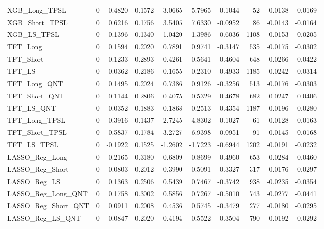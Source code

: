 \begin{tabular}{llrrrrrrrr}
\cline{1-10}
XGB\_Long\_TPSL & 0 & 0.4820 & 0.1572 & 3.0665 & 5.7965 & -0.1044 & 52 & -0.0138 & -0.0169 \\
\cline{1-10}
XGB\_Short\_TPSL & 0 & 0.6216 & 0.1756 & 3.5405 & 7.6330 & -0.0952 & 86 & -0.0143 & -0.0164 \\
\cline{1-10}
XGB\_LS\_TPSL & 0 & -0.1396 & 0.1340 & -1.0420 & -1.3986 & -0.6036 & 1108 & -0.0153 & -0.0205 \\
\cline{1-10}
TFT\_Long & 0 & 0.1594 & 0.2020 & 0.7891 & 0.9741 & -0.3147 & 535 & -0.0175 & -0.0302 \\
\cline{1-10}
TFT\_Short & 0 & 0.1233 & 0.2893 & 0.4261 & 0.5641 & -0.4604 & 648 & -0.0266 & -0.0422 \\
\cline{1-10}
TFT\_LS & 0 & 0.0362 & 0.2186 & 0.1655 & 0.2310 & -0.4933 & 1185 & -0.0242 & -0.0314 \\
\cline{1-10}
TFT\_Long\_QNT & 0 & 0.1495 & 0.2024 & 0.7386 & 0.9126 & -0.3256 & 513 & -0.0176 & -0.0303 \\
\cline{1-10}
TFT\_Short\_QNT & 0 & 0.1144 & 0.2806 & 0.4075 & 0.5329 & -0.4678 & 682 & -0.0247 & -0.0406 \\
\cline{1-10}
TFT\_LS\_QNT & 0 & 0.0352 & 0.1883 & 0.1868 & 0.2513 & -0.4354 & 1187 & -0.0196 & -0.0280 \\
\cline{1-10}
TFT\_Long\_TPSL & 0 & 0.3916 & 0.1437 & 2.7245 & 4.8302 & -0.1027 & 61 & -0.0128 & -0.0163 \\
\cline{1-10}
TFT\_Short\_TPSL & 0 & 0.5837 & 0.1784 & 3.2727 & 6.9398 & -0.0951 & 91 & -0.0145 & -0.0168 \\
\cline{1-10}
TFT\_LS\_TPSL & 0 & -0.1922 & 0.1525 & -1.2602 & -1.7223 & -0.6944 & 1202 & -0.0191 & -0.0232 \\
\cline{1-10}
LASSO\_Reg\_Long & 0 & 0.2165 & 0.3180 & 0.6809 & 0.8699 & -0.4960 & 653 & -0.0284 & -0.0460 \\
\cline{1-10}
LASSO\_Reg\_Short & 0 & 0.0803 & 0.2012 & 0.3990 & 0.5091 & -0.3327 & 317 & -0.0176 & -0.0297 \\
\cline{1-10}
LASSO\_Reg\_LS & 0 & 0.1363 & 0.2506 & 0.5439 & 0.7467 & -0.3742 & 938 & -0.0235 & -0.0354 \\
\cline{1-10}
LASSO\_Reg\_Long\_QNT & 0 & 0.1758 & 0.3002 & 0.5856 & 0.7267 & -0.5010 & 743 & -0.0277 & -0.0441 \\
\cline{1-10}
LASSO\_Reg\_Short\_QNT & 0 & 0.0911 & 0.2008 & 0.4536 & 0.5745 & -0.3479 & 277 & -0.0180 & -0.0295 \\
\cline{1-10}
LASSO\_Reg\_LS\_QNT & 0 & 0.0847 & 0.2020 & 0.4194 & 0.5522 & -0.3504 & 790 & -0.0192 & -0.0292 \\

\end{tabular}
